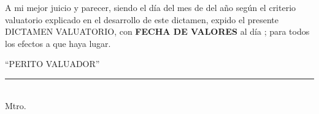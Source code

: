 
A mi mejor juicio y parecer, siendo
\textcolor{principal}
{el día \diaInforme del mes de \mesInforme del a\~no \annoInforme} 
seg\'un el criterio valuatorio explicado en el desarrollo de este dictamen, 
expido el presente \textcolor{principal}{DICTAMEN VALUATORIO}, 
con \textcolor{principal}{\textbf{FECHA DE VALORES}} al d\'ia 
\textcolor{principal}{\textbf{\fechaValores}}; para todos 
los efectos a que haya lugar.\\

\begin{center}
	``PERITO VALUADOR''\\[1cm]
	\rule{7cm}{.4pt}\\
	Mtro. \peritoValuador \\ 
	\textcolor{principal}{\descripcionFirmaPerito}
\end{center}
